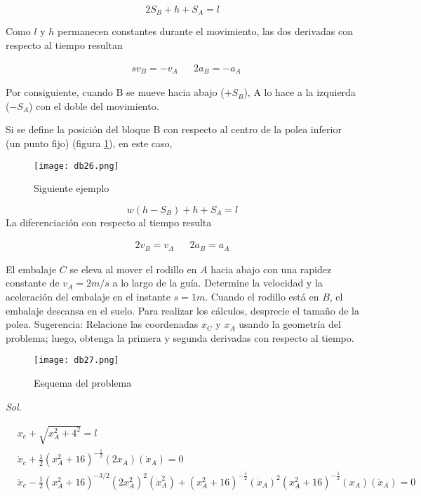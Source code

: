 \begin{equation}
    2S_B+h+S_A=l
\end{equation}

Como $l$ y $h$ permanecen constantes durante el movimiento, las dos
derivadas con respecto al tiempo resultan

\begin{align*}
    &sv_B=-v_A&& 2a_B=-a_A
\end{align*}

Por consiguiente, cuando B se mueve hacia abajo ($+S_B$), A lo hace a
la izquierda ($-S_A$) con el doble del movimiento.

Si se define la posición del bloque B con respecto al centro de la
polea inferior (un punto fijo) (figura \ref{db26}), en este caso,

\begin{figure}[h!]
  \centerline{\texttt{[image: db26.png]}}
  \caption{Siguiente ejemplo}
  \label{db26}
\end{figure}

\begin{equation}
    w(h-S_B)+h+S_A=l
\end{equation}
La diferenciación con respecto al tiempo resulta

\begin{align*}
    2v_B=v_A&&2a_B=a_A
\end{align*}

\begin{example}
    El embalaje $C$ se eleva al mover el rodillo en $A$ hacia abajo
con una rapidez constante de $v_A = 2 m/s$ a lo largo de la guía.
Determine la velocidad y la aceleración del embalaje en el instante $s =1m$. 
Cuando el rodillo está en $B$, el embalaje descansa en el suelo.
Para realizar los cálculos, desprecie el tamaño de la polea. Sugerencia:
Relacione las coordenadas $x_C$ y $x_A$ usando la geometría del problema;
luego, obtenga la primera y segunda derivadas con respecto al tiempo.
\end{example}

\begin{figure}[h!]
  \centerline{\texttt{[image: db27.png]}}
  \caption{Esquema del problema}
  \label{db27}
\end{figure}

\textit{ Sol. }

\begin{align*}
    &x_c+\sqrt{x_A^2+4^2}=l\\
    &\dot{x}_c+\frac{1}{2}\left(x_A^2+16\right)^{-\frac{1}{2}}(2x_A)(\dot{x}_A)=0\\
    &\ddot{x}_c-\frac{1}{2}\left(x_A^2+16\right)^{-3/2}\left(2x^2_A\right)^2(\dot{x}^2_A)+\left(x^2_A+16\right)^{-\frac{1}{2}}\left(\dot{x}_A\right)^2\left(x_A^2+16\right)^{-\frac{1}{2}}(x_A)(\ddot{x}_A)=0
\end{align*}

